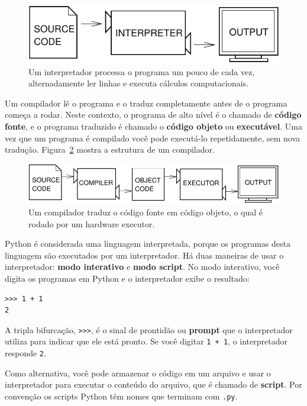 \documentclass[10pt]{book}
\begin{document}
\begin{figure}
\centerline
{\includegraphics[scale=0.9]{figs/interpret.pdf}}
\caption{Um interpretador processa o programa um pouco de cada vez,
alternadamente ler linhas e executa cálculos computacionais.}
\label{fig.interpret}
\end{figure}

Um compilador lê o programa e o traduz completamente antes de o
programa começa a rodar. Neste contexto, o programa de alto nível é
o chamado de {\bf código fonte}, e o programa traduzido é chamado o
{\bf código objeto} ou {\bf executável}. Uma vez que um programa é
compilado você pode executá-lo repetidamente, sem nova tradução.
Figura~\ref{fig.compile} mostra a estrutura de um compilador.

\begin{figure}
\centerline
{\includegraphics[scale=0.9]{figs/compile.pdf}}
\caption{Um compilador traduz o código fonte em código objeto, o qual é
rodado por um hardware executor.}
\label{fig.compile}
\end{figure}

Python é considerada uma linguagem interpretada, porque os programas desta linguagem
são executados por um interpretador. Há duas maneiras de usar o
interpretador: {\bf modo interativo} e {\bf modo script}. No
modo interativo, você digita os programas em Python e o interpretador exibe
o resultado:

\begin{verbatim}
>>> 1 + 1
2
\end{verbatim}
%
A tripla bifurcação, \verb">>>", é o sinal de prontidão ou
{\bf prompt} que o interpretador utiliza para indicar que ele está pronto. Se
você digitar {\tt 1 + 1}, o interpretador responde {\tt 2}.

Como alternativa, você pode armazenar o código em um arquivo e usar o interpretador para
executar o conteúdo do arquivo, que é chamado de {\bf script}. Por
convenção os scripts Python têm nomes que terminam com {\tt .py}.
\end{document}
